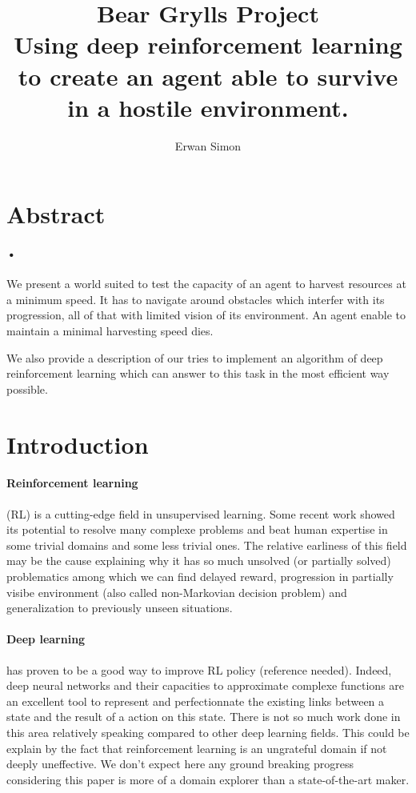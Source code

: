 \documentclass{article}
\title{Bear Grylls Project \\ \large  Using deep reinforcement learning to create an agent able to survive in a hostile environment.}
\author{Erwan Simon}
\begin{document}
\maketitle

\tableofcontents

\newpage

\section{Abstract}

\paragraph{•}
We present a world suited to test the capacity of an agent to harvest resources at a minimum speed. It has to navigate around obstacles which interfer with its progression, all of that with limited vision of its environment. An agent enable to maintain a minimal harvesting speed dies.\par
We also provide a description of our tries to implement an algorithm of deep reinforcement learning which can answer to this task in the most efficient way possible.\par

\section{Introduction}

\paragraph{Reinforcement learning}
(RL) is a cutting-edge field in unsupervised learning. Some recent work showed its potential to resolve many complexe problems and beat human expertise in some trivial domains\cite{DBLP:journals/corr/MnihKSGAWR13} and some less trivial ones\cite{healthcare}. The relative earliness of this field may be the cause explaining why it has so much unsolved (or partially solved) problematics among which we can find delayed reward, progression in partially visibe environment (also called non-Markovian decision problem)\cite{bakker2002reinforcement} and generalization to previously unseen situations\cite{sutton1996generalization}.

\paragraph{Deep learning}
has proven to be a good way to improve RL policy (reference needed). Indeed, deep neural networks and their capacities to approximate complexe functions are an excellent tool to represent and perfectionnate the existing links between a state and the result of a action on this state. There is not so much work done in this area relatively speaking compared to other deep learning fields. This could be explain by the fact that reinforcement learning is an ungrateful domain if not deeply uneffective\cite{rlblogpost}. We don't expect here any ground breaking progress considering this paper is more of a domain explorer than a state-of-the-art maker.
\end{document}
